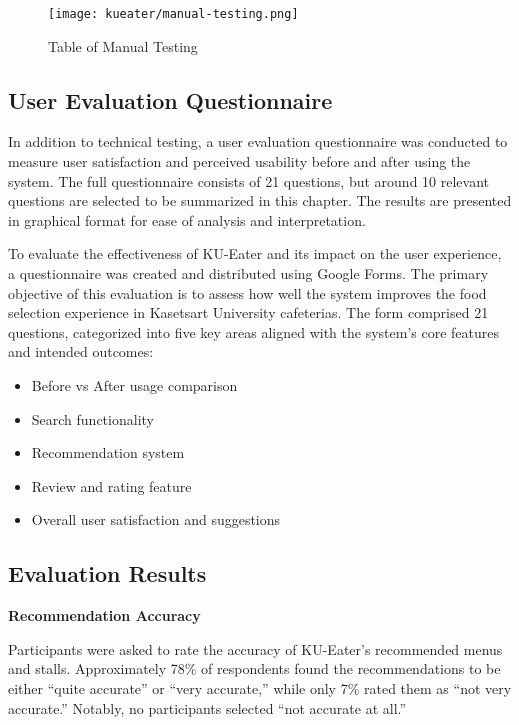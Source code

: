 \begin{figure}[h!]
    \centering
    \texttt{[image: kueater/manual-testing.png]}
    \caption{Table of Manual Testing}
    \label{fig:manual-testing}
\end{figure}

\subsection{User Evaluation Questionnaire}
\label{subsection:questionnaire}
In addition to technical testing, a user evaluation questionnaire was conducted to measure user satisfaction and perceived usability before and after using the system. The full questionnaire consists of 21 questions, but around 10 relevant questions are selected to be summarized in this chapter. The results are presented in graphical format for ease of analysis and interpretation.

To evaluate the effectiveness of KU-Eater and its impact on the user experience, a questionnaire was created and distributed using Google Forms. The primary objective of this evaluation is to assess how well the system improves the food selection experience in Kasetsart University cafeterias. The form comprised 21 questions, categorized into five key areas aligned with the system's core features and intended outcomes:

\begin{itemize}[leftmargin=80pt]
    \item Before vs After usage comparison
    \item Search functionality
    \item Recommendation system
    \item Review and rating feature
    \item Overall user satisfaction and suggestions
\end{itemize}

\subsection{Evaluation Results}
\label{subsection:evaluation-results}

\textbf{Recommendation Accuracy}

Participants were asked to rate the accuracy of KU-Eater's recommended menus and stalls. Approximately 78\% of respondents found the
recommendations to be either “quite accurate” or “very accurate,” while only 7\% rated 
them as “not very accurate.” Notably, no participants selected “not accurate at all.”

